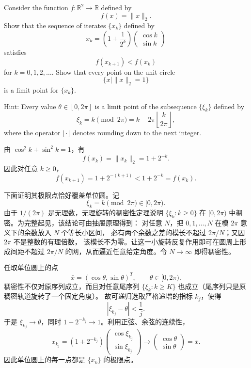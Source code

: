 \documentclass{ctexart}
\begin{document}
\begin{problem}[2.5]
Consider the function $f:\mathbb{R}^2\to\mathbb{R}$ defined by
\[
    f(x)=\|x\|_2.
\]
Show that the sequence of iterates $\{x_k\}$ defined by
\[
    x_k=
    \left(1+\frac{1}{2^k}\right)
    \begin{pmatrix}
        \cos k\\
        \sin k
    \end{pmatrix}
\]
satisfies
\[
    f(x_{k+1})<f(x_k)
\]
for $k=0,1,2,\ldots$. Show that every point on the unit circle
\[
    \{x\mid \|x\|_2=1\}
\]
is a limit point for $\{x_k\}$.

Hint: Every value $\theta\in[0,2\pi]$ is a limit point of the subsequence
$\{\xi_k\}$ defined by
\[
    \xi_k
    =k\pmod{2\pi}
    =k-2\pi\left\lfloor\frac{k}{2\pi}\right\rfloor,
\]
where the operator $\lfloor\cdot\rfloor$ denotes rounding down to the next integer.
\end{problem}

\begin{solution}
由 $\cos^2k+\sin^2k=1$，有
\[
    f(x_k)=\|x_k\|_2=1+2^{-k}.
\]
因此对任意 $k\geq0$，
\[
    f(x_{k+1})=1+2^{-(k+1)}<1+2^{-k}=f(x_k).
\]

下面证明其极限点恰好覆盖单位圆。记
\[
    \xi_k=k\pmod{2\pi}\in[0,2\pi).
\]
由于 $1/(2\pi)$ 是无理数，无理旋转的稠密性定理说明
$\{\xi_k:k\geq0\}$ 在 $[0,2\pi)$ 中稠密。为完整起见，该结论可由抽屉原理得到：
对任意 $N$，把 $0,1,\ldots,N$ 在模 $2\pi$ 意义下的余数放入 $N$ 个等长小区间，
必有两个余数之差的模长不超过 $2\pi/N$；又因 $2\pi$ 不是整数的有理倍数，
该模长不为零。让这一小旋转反复作用即可在圆周上形成间距不超过 $2\pi/N$
的网，从而逼近任意给定角度。令 $N\to\infty$ 即得稠密性。

任取单位圆上的点
\[
    \bar x=(\cos\theta,\sin\theta)^T,
    \qquad \theta\in[0,2\pi).
\]
稠密性不仅对原序列成立，而且对任意尾序列
$\{\xi_k:k\geq K\}$ 也成立（尾序列只是原稠密轨道旋转了一个固定角度）。
故可递归选取严格递增的指标 $k_j$，使得
\[
    |\xi_{k_j}-\theta|<\frac1j.
\]
于是 $\xi_{k_j}\to\theta$，同时 $1+2^{-k_j}\to1$。利用正弦、余弦的连续性，
\[
    x_{k_j}
    =\left(1+2^{-k_j}\right)
      \begin{pmatrix}\cos\xi_{k_j}\\\sin\xi_{k_j}\end{pmatrix}
    \longrightarrow
      \begin{pmatrix}\cos\theta\\\sin\theta\end{pmatrix}
    =\bar x.
\]
因此单位圆上的每一点都是 $\{x_k\}$ 的极限点。
\end{solution}
\end{document}
